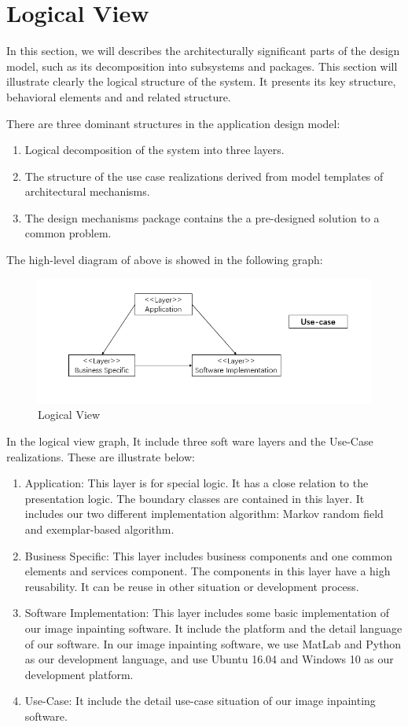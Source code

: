 \section{Logical View}
\qquad In this section, we will describes the architecturally significant parts of the design model, such as its decomposition into subsystems and packages. This section will illustrate clearly the logical structure of the system. It presents its key structure, behavioral elements and and related structure.

There are three dominant structures in the application design model:
\begin{enumerate}
	\item Logical decomposition of the system into three layers.
	\item The structure of the use case realizations derived from model templates of architectural mechanisms.
	\item The design mechanisms package contains the a pre-designed solution to a common problem. 
\end{enumerate}

The high-level diagram of above is showed in the following graph:
\begin{figure}[H]
	\centering
	\includegraphics[width=1.0\linewidth]{logical.jpg}
	\caption{Logical View}
\end{figure}


In the logical view graph, It include three soft ware layers and the Use-Case realizations. These are illustrate below:
\begin{enumerate}
	\item Application: This layer is for special logic. It has a close relation to the presentation logic. The boundary classes are contained in this layer. It includes our two different implementation algorithm: Markov random field and exemplar-based algorithm.
	\item Business Specific: This layer includes business components and one common elements and services component. The components in this layer have a high reusability. It can be reuse in other situation or development process.
	\item Software Implementation: This layer includes some basic implementation of our image inpainting software. It include the platform and the detail language of our software. In our image inpainting software, we use MatLab and Python as our development language, and use Ubuntu 16.04 and Windows 10 as our development platform.
	\item Use-Case: It include the detail use-case situation of our image inpainting software.
\end{enumerate}

